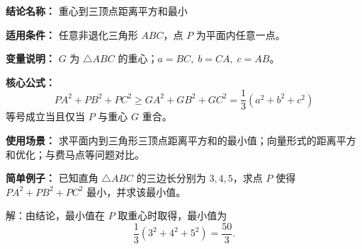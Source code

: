 \textbf{结论名称：} 重心到三顶点距离平方和最小

\textbf{适用条件：} 任意非退化三角形 \(ABC\)，点 \(P\) 为平面内任意一点。

\textbf{变量说明：} \(G\) 为 \(\triangle ABC\) 的重心；\(a=BC,\; b=CA,\; c=AB\)。

\textbf{核心公式：}
\[
\boxed{PA^{2}+PB^{2}+PC^{2} \ge GA^{2}+GB^{2}+GC^{2} = \frac{1}{3}(a^{2}+b^{2}+c^{2})}
\]
等号成立当且仅当 \(P\) 与重心 \(G\) 重合。

\textbf{使用场景：} 求平面内到三角形三顶点距离平方和的最小值；向量形式的距离平方和优化；与费马点等问题对比。

\textbf{简单例子：} 已知直角 \(\triangle ABC\) 的三边长分别为 \(3,4,5\)，求点 \(P\) 使得 \(PA^{2}+PB^{2}+PC^{2}\) 最小，并求该最小值。

解：由结论，最小值在 \(P\) 取重心时取得，最小值为
\[
\frac{1}{3}(3^{2}+4^{2}+5^{2})=\frac{50}{3}.
\]